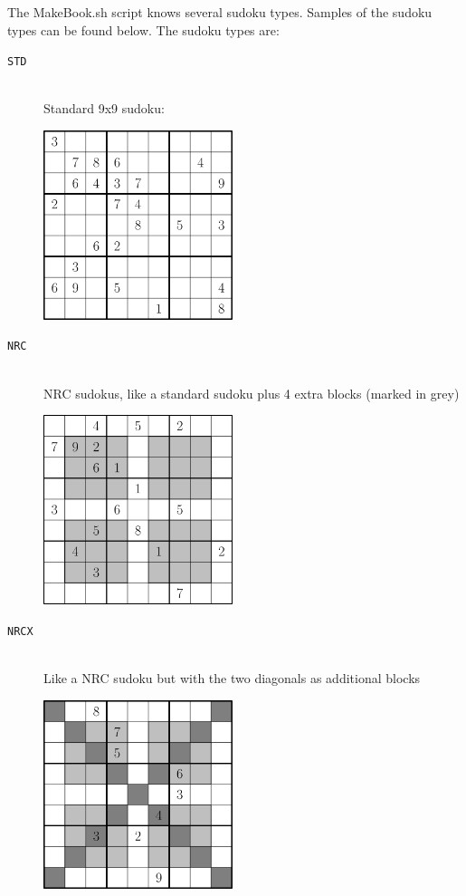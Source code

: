 \documentclass[12pt]{article}
\begin{document}
The MakeBook.sh script knows several sudoku types. Samples of the sudoku types can be found below. The sudoku types are:
\begin{description}
\item [\texttt{STD}] \hfill \\Standard 9x9 sudoku:
\begin{center}
	\includegraphics[width=0.45\textwidth]{STD}		
\end{center}
\item [\texttt{NRC}] \hfill \\ NRC sudokus, like a standard sudoku plus 4 extra blocks (marked in grey)
\begin{center}
	\includegraphics[width=0.45\textwidth]{NRC}		
\end{center}
\item [\texttt{NRCX}] \hfill \\ Like a NRC sudoku but with the two diagonals as additional blocks
\begin{center}
	\includegraphics[width=0.45\textwidth]{NRCX}		

\end{center}
\end{description}
\end{document}
